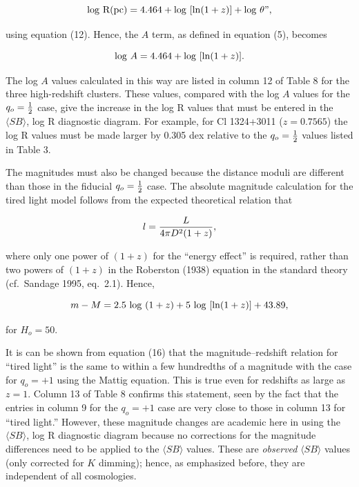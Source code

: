 \documentclass[preprint]{aastex}
\begin{document}
\begin{equation}
   {\rm log~R(pc)} = 4.464 + {\rm log}~[{\rm ln} (1 + z)] + {\rm log}~\theta",
\end{equation}

\noindent using equation (12). Hence, the $A$ term, as defined in
equation (5), becomes

\begin{equation}
          {\rm log}~A = 4.464 + {\rm log}~[{\rm ln} (1 + z)].
\end{equation}

The log $A$ values calculated in this way are listed in column 12 of
Table 8 for the three high-redshift clusters. These values, compared
with the log $A$ values for the $q_o = {1\over{2}}$ case, give the
increase in the log R values that must be entered in the $\langle SB
\rangle$, log R diagnostic diagram. For example, for Cl 1324+3011 ($z
= 0.7565$) the log R values must be made larger by 0.305 dex relative
to the $q_o = {1\over{2}}$ values listed in Table 3.
     
The magnitudes must also be changed because the distance moduli are
different than those in the fiducial $q_o = {1\over{2}}$ case. The
absolute magnitude calculation for the tired light model follows
from the expected theoretical relation that 

\begin{equation}
	l = {L\over{4\pi D^2(1+z)}},
\end{equation}

\noindent where only one power of $(1+z)$ for the ``energy effect'' is
required, rather than two powers of $(1+z)$ in the Roberston (1938)
equation in the standard theory (cf.\ Sandage 1995, eq.\ 2.1). Hence,

\begin{equation}
	m-M = 2.5~{\rm log}~(1+z) + 5~{\rm log}~[{\rm ln}(1+z)] +43.89,
\end{equation}

\noindent for $H_o = 50$.

It is can be shown from equation (16) that the magnitude--redshift
relation for ``tired light'' is the same to within a few hundredths of
a magnitude with the case for $q_o = +1$ using the Mattig
equation. This is true even for redshifts as large as $z = 1$. Column
13 of Table 8 confirms this statement, seen by the fact that the
entries in column 9 for the $q_o = +1$ case are very close to those in
column 13 for ``tired light.'' However, these magnitude changes are
academic here in using the $\langle SB \rangle$, log R diagnostic
diagram because no corrections for the magnitude differences need to
be applied to the $\langle SB \rangle$ values. These are {\it
observed} $\langle SB \rangle$ values (only corrected for $K$
dimming); hence, as emphasized before, they are independent of all
cosmologies.
\end{document}
